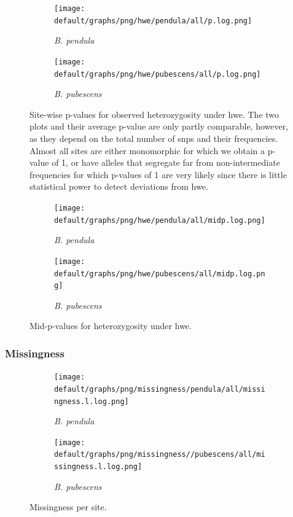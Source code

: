 \documentclass[hidelinks,11pt]{article}
\newcommand{\pendula}{\textit{B. pendula}}
\newcommand{\pubescens}{\textit{B. pubescens}}
\begin{document}
    \begin{figure}[H]
        \centering
        \begin{subfigure}[b]{0.49\textwidth}
            \centering
            \texttt{[image: default/graphs/png/hwe/pendula/all/p.log.png]}
            \caption{\pendula{}}
            \label{fig:p_hwe_pendula}
        \end{subfigure}
        \hfill
        \begin{subfigure}[b]{0.49\textwidth}
            \centering
            \texttt{[image: default/graphs/png/hwe/pubescens/all/p.log.png]}
            \caption{\pubescens{}}
            \label{fig:p_hwe_pubescens}
        \end{subfigure}
        \caption{Site-wise p-values for observed heterozygosity under \acrshort{hwe}. The two plots and their average p-value are only partly comparable, however, as they depend on the total number of \acrshort{snp}s and their frequencies. Almost all sites are either monomorphic for which we obtain a p-value of 1, or have alleles that segregate far from non-intermediate frequencies for which p-values of 1 are very likely since there is little statistical power to detect deviations from \acrshort{hwe}.}
        \label{fig:p_hwe}
    \end{figure}

    \begin{figure}[H]
        \centering
        \begin{subfigure}[b]{0.49\textwidth}
            \centering
            \texttt{[image: default/graphs/png/hwe/pendula/all/midp.log.png]}
            \caption{\pendula{}}
        \end{subfigure}
        \hfill
        \begin{subfigure}[b]{0.49\textwidth}
            \centering
            \texttt{[image: default/graphs/png/hwe/pubescens/all/midp.log.png]}
            \caption{\pubescens{}}
        \end{subfigure}
        \caption{Mid-p-values for heterozygosity under \acrshort{hwe}.}
        \label{fig:mid-p-hwe}
    \end{figure}

    \subsubsection{Missingness}

    \begin{figure}[H]
        \centering
        \begin{subfigure}[b]{0.49\textwidth}
            \centering
            \texttt{[image: default/graphs/png/missingness/pendula/all/missingness.l.log.png]}
            \caption{\pendula{}}
        \end{subfigure}
        \hfill
        \begin{subfigure}[b]{0.49\textwidth}
            \centering
            \texttt{[image: default/graphs/png/missingness//pubescens/all/missingness.l.log.png]}
            \caption{\pubescens{}}
        \end{subfigure}
        \caption{Missingness per site.}
        \label{fig:missingness-sample}
    \end{figure}
\end{document}
